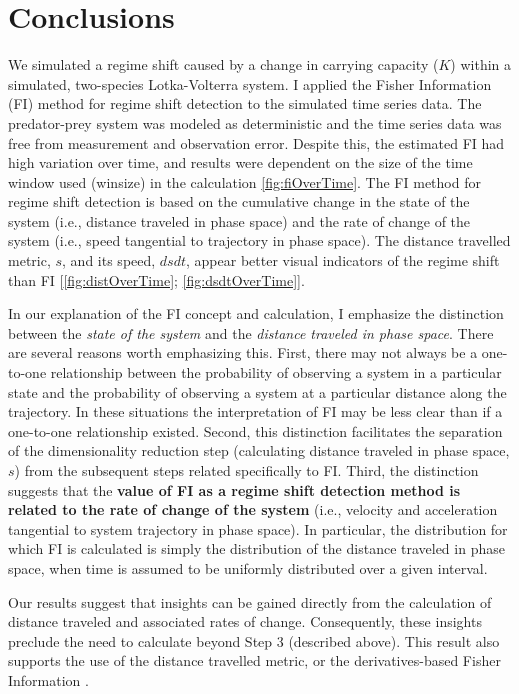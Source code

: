 \documentclass[12pt,twoside,openany]{reedthesis}
\begin{document}
\section{Conclusions}\label{conclusions}

We simulated a regime shift caused by a change in carrying capacity
(\(K\)) within a simulated, two-species Lotka-Volterra system. I applied
the Fisher Information (FI) method for regime shift detection to the
simulated time series data. The predator-prey system was modeled as
deterministic and the time series data was free from measurement and
observation error. Despite this, the estimated FI had high variation
over time, and results were dependent on the size of the time window
used (winsize) in the calculation \ref{fig:fiOverTime}. The FI method
for regime shift detection is based on the cumulative change in the
state of the system (i.e., distance traveled in phase space) and the
rate of change of the system (i.e., speed tangential to trajectory in
phase space). The distance travelled metric, \(s\), and its speed,
\(dsdt\), appear better visual indicators of the regime shift than FI
{[}\ref{fig:distOverTime}; \ref{fig:dsdtOverTime}{]}.

In our explanation of the FI concept and calculation, I emphasize the
distinction between the \emph{state of the system} and the
\emph{distance traveled in phase space}. There are several reasons worth
emphasizing this. First, there may not always be a one-to-one
relationship between the probability of observing a system in a
particular state and the probability of observing a system at a
particular distance along the trajectory. In these situations the
interpretation of FI may be less clear than if a one-to-one relationship
existed. Second, this distinction facilitates the separation of the
dimensionality reduction step (calculating distance traveled in phase
space, \(s\)) from the subsequent steps related specifically to FI.
Third, the distinction suggests that the \textbf{value of FI as a regime
shift detection method is related to the rate of change of the system}
(i.e., velocity and acceleration tangential to system trajectory in
phase space). In particular, the distribution for which FI is calculated
is simply the distribution of the distance traveled in phase space, when
time is assumed to be uniformly distributed over a given interval.

Our results suggest that insights can be gained directly from the
calculation of distance traveled and associated rates of change.
Consequently, these insights preclude the need to calculate beyond Step
3 (described above). This result also supports the use of the distance
travelled metric, or the derivatives-based Fisher Information
\label{eq:fiDerivs}.
\end{document}
